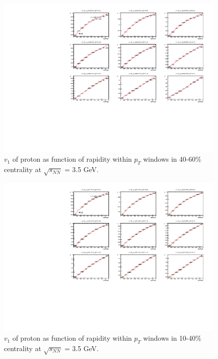 \begin{figure}[hbt!]
\centering
\includegraphics[width=0.85\linewidth]{figures/chapter03/3p5gev_protonp_v1VSy_9pT_cent0.pdf}
\caption{$v_1$ of proton as function of rapidity within $p_T$ windows in 40-60\% centrality at $\sqrt{s_{NN}}$ = 3.5 GeV.}
\label{fig:3p5gev_proton_v1y_pt_cent0}
\end{figure}
    
\begin{figure}[hbt!]
\centering
\includegraphics[width=0.85\linewidth]{figures/chapter03/3p5gev_protonp_v1VSy_9pT_cent1.pdf}
\caption{$v_1$ of proton as function of rapidity within $p_T$ windows in 10-40\% centrality at $\sqrt{s_{NN}}$ = 3.5 GeV.}
\label{fig:3p5gev_proton_v1y_pt_cent1}
\end{figure}
        
